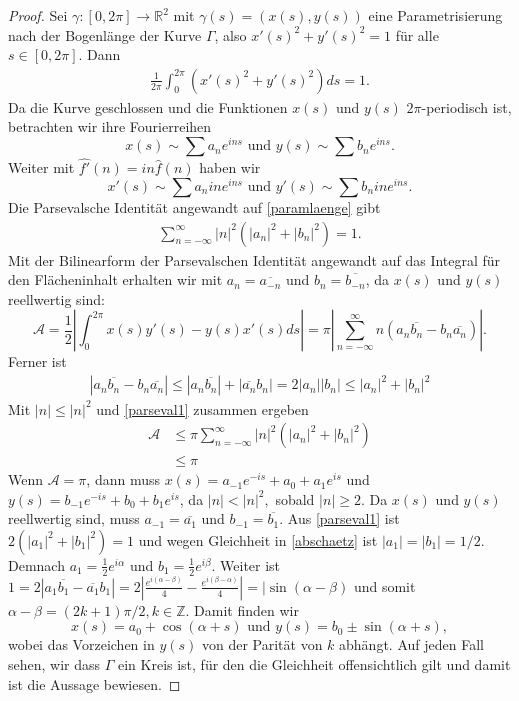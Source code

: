 \documentclass[12pt,a4paper]{article}
\theoremstyle{plain}
\newcommand{\R}{\mathbb{R}}
\newcommand{\Z}{\mathbb{Z}}
\numberwithin{equation}{section}
\begin{document}
\begin{proof}
Sei $\gamma:[0,2\pi]\rightarrow \R^2$ mit $\gamma(s)=(x(s),y(s))$ eine Parametrisierung nach der Bogenlänge der Kurve $\Gamma$, also $x'(s)^2+y'(s)^2=1$ für alle $s\in [0,2\pi]$. Dann \begin{align}\label{paramlaenge}
\frac{1}{2\pi} \int_0^{2\pi} {\left(x'(s)^2+y'(s)^2\right) ds} = 1.
\end{align} 
Da die Kurve geschlossen und die Funktionen $x(s)$ und $y(s)$ $2\pi$-periodisch ist, betrachten wir ihre Fourierreihen \[x(s)\sim \sum a_ne^{ins} \text{ und } y(s)\sim \sum b_ne^{ins}. \]  Weiter mit $\hat{f'}(n)=i n\hat{f}(n)$ haben wir \[x'(s)\sim \sum  a_n i n e^{ins} \text{ und } y'(s)\sim \sum b_n i n e^{ins}. \] Die Parsevalsche Identität angewandt auf \eqref{paramlaenge} gibt \begin{align} \label{parseval1}
\sum_{n=-\infty}^\infty |n|^2(|a_n|^2+|b_n|^2)=1.
\end{align}
Mit der Bilinearform der Parsevalschen Identität angewandt auf das Integral für den Flächen\-in\-halt erhalten wir mit $a_n=\overline{a_{-n}}$ und $b_n=\overline{b_{-n}}$, da $x(s)$ und $y(s)$ reellwertig sind:
\[\mathcal{A}=\frac{1}{2} \left|\int_0^{2\pi} {x(s)y'(s)-y(s)x'(s)ds}\right|=\pi\left|\sum_{n=-\infty}^\infty {n\left(a_n\overline{b_n}-b_n\overline{a_n}\right) } \right|. \] 
Ferner ist \begin{align} \label{abschaetz}
|a_n\overline{b_n} -b_n\overline{a_n}|\leq |a_n\overline{b_n}|+|\overline{a_n}b_n|=2|a_n||b_n|\leq |a_n|^2+|b_n|^2
\end{align}
Mit $|n|\leq |n|^2$ und \eqref{parseval1} zusammen ergeben \begin{align*}
\mathcal{A}&\leq \pi \sum_{n=-\infty}^{\infty}{|n|^2(|a_n|^2+|b_n|^2)} \\
&\leq \pi
\end{align*}
Wenn $\mathcal{A}=\pi$, dann muss $x(s)=a_{-1}e^{-is}+a_0+a_1e^{is}$ und $y(s)=b_{-1}e^{-is}+b_0+b_1e^{is}$, da $|n|<|n|^2,$ sobald $|n|\geq 2$. Da $x(s)$ und $y(s)$ reellwertig sind, muss $a_{-1}=\overline{a_1}$ und $b_{-1}=\overline{b_1}$. Aus \eqref{parseval1} ist $2(|a_1|^2+|b_1|^2)=1$ und wegen Gleichheit in \eqref{abschaetz} ist $|a_1|=|b_1|=1/2.$ Demnach $a_1=\frac{1}{2}e^{i\alpha}$ und $b_1=\frac{1}{2}e^{i\beta}$. Weiter ist $1=2|a_1\overline{b_1}-\overline{a_1}b_1|=2|\frac{e^{i(\alpha-\beta)}}{4}-\frac{e^{i(\beta-\alpha)}}{4}|=|\sin(\alpha - \beta)$ und somit $\alpha-\beta=(2k+1)\pi/2, k\in \Z$. Damit finden wir
\[ x(s)=a_0+\cos(\alpha+s) \text{ und } y(s)=b_0 \pm\sin(\alpha +s),\] wobei das Vorzeichen in $y(s)$ von der Parität von $k$ abhängt. Auf jeden Fall sehen, wir dass $\Gamma$ ein Kreis ist, für den die Gleichheit offensichtlich gilt und damit ist die Aussage bewiesen.
\end{proof}
\end{document}
